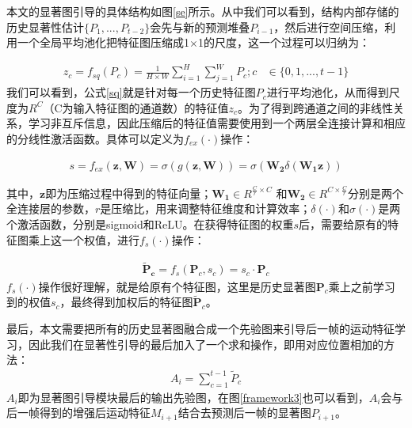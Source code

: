 本文的显著图引导的具体结构如图\ref{se}所示。从中我们可以看到，结构内部存储的历史显著性估计$\{P_1, ..., P_{t-2}\}$会先与新的预测堆叠$P_{i-1}$，然后进行空间压缩，利用一个全局平均池化把特征图压缩成1$\times$1的尺度，这一个过程可以归纳为：

\begin{equation}
\label{sq}
\begin{aligned}
   z_{c} =f_{sq}(P_c) = \frac{1}{H \times W} \sum\limits_{i=1}^{H} \sum\limits_{j=1}^{W} P_c; c &\in \{0,1,...,t-1\}
 \end{aligned}
\end{equation} 我们可以看到，公式\ref{sq}就是针对每一个历史特征图$P_{c}$进行平均池化，从而得到尺度为$R^C$（C为输入特征图的通道数）的特征值$z_{c}$。为了得到跨通道之间的非线性关系，学习非互斥信息，因此压缩后的特征值需要使用到一个两层全连接计算和相应的分线性激活函数。具体可以定义为$f_{ex}(\cdot)$操作：

\begin{equation}
\label{ex}
\begin{aligned}
   s = f_{ex}(\bm{z}, \textbf{W}) = \sigma(g(\bm{z}, \bm{W})) = \sigma(\bm{W_2}\delta(\bm{W_1}\bm{z}))
 \end{aligned}
\end{equation}

其中，$\bm{z}$即为压缩过程中得到的特征向量；$\bm{W_1} \in R^{\frac{C}{r}\times C} $ 和$\bm{W_2} \in R^{C\times \frac{C}{r}} $分别是两个全连接层的参数，$r$是压缩比，用来调整特征维度和计算效率；$\delta(\cdot)$和$\sigma(\cdot)$是两个激活函数，分别是sigmoid和ReLU。在获得特征图的权重$s$后，需要给原有的特征图乘上这一个权值，进行$f_s(\cdot)$操作：

\begin{equation}
\label{scale}
\begin{aligned}
   \bm{\tilde{P}_c} = f_{s}(\bm{P}_c, s_c) = s_c \cdot \textbf{P}_c
\end{aligned}
\end{equation} $f_s(\cdot)$操作很好理解，就是给原有个特征图，这里是历史显著图$\bm{P}_c$乘上之前学习到的权值$s_c$，最终得到加权后的特征图$\bm{\tilde{P}}_c$。

最后，本文需要把所有的历史显著图融合成一个先验图来引导后一帧的运动特征学习，因此我们在显著性引导的最后加入了一个求和操作，即用对应位置相加的方法：
\begin{equation}
\label{sum_scale}
\begin{aligned}
   A_i = \sum\limits_{c=1}^{t-1}\tilde{P}_c
 \end{aligned}
\end{equation} $A_i$即为显著图引导模块最后的输出先验图，在图\ref{framework3}也可以看到，$A_i$会与后一帧得到的增强后运动特征$M_{i+1}$结合去预测后一帧的显著图$P_{i+1}$。


